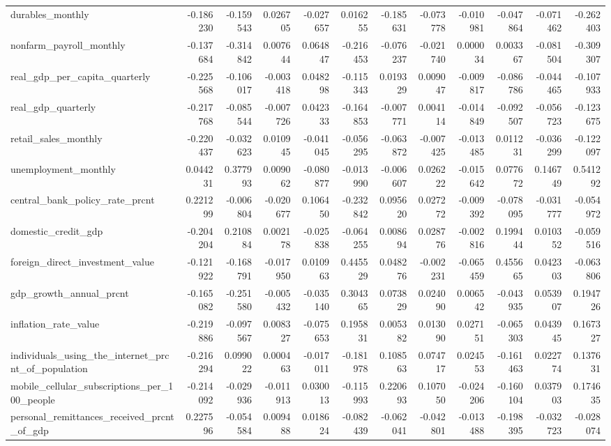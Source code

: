 \begin{tabular}{lrrrrrrrrrrr}
durables_monthly & -0.186230 & -0.159543 & 0.026705 & -0.027657 & 0.016255 & -0.185631 & -0.073778 & -0.010981 & -0.047864 & -0.071462 & -0.262403 \\
nonfarm_payroll_monthly & -0.137684 & -0.314842 & 0.007644 & 0.064847 & -0.216453 & -0.076237 & -0.021740 & 0.000034 & 0.003367 & -0.081504 & -0.309307 \\
real_gdp_per_capita_quarterly & -0.225568 & -0.106017 & -0.003418 & 0.048298 & -0.115343 & 0.019329 & 0.009047 & -0.009817 & -0.086786 & -0.044465 & -0.107933 \\
real_gdp_quarterly & -0.217768 & -0.085544 & -0.007726 & 0.042333 & -0.164853 & -0.007771 & 0.004114 & -0.014849 & -0.092507 & -0.056723 & -0.123675 \\
retail_sales_monthly & -0.220437 & -0.032623 & 0.010945 & -0.041045 & -0.056295 & -0.063872 & -0.007425 & -0.013485 & 0.011231 & -0.036299 & -0.122097 \\
unemployment_monthly & 0.044231 & 0.377993 & 0.009062 & -0.080877 & -0.013990 & -0.006607 & 0.026222 & -0.015642 & 0.077672 & 0.146749 & 0.541292 \\
central_bank_policy_rate_prcnt & 0.221299 & -0.006804 & -0.020677 & 0.106450 & -0.232842 & 0.095620 & 0.027272 & -0.009392 & -0.078095 & -0.031777 & -0.054972 \\
domestic_credit_gdp & -0.204204 & 0.210884 & 0.002178 & -0.025838 & -0.064255 & 0.008694 & 0.028776 & -0.002816 & 0.199444 & 0.010352 & -0.059516 \\
foreign_direct_investment_value & -0.121922 & -0.168791 & -0.017950 & 0.010963 & 0.445529 & 0.048276 & -0.002231 & -0.065459 & 0.455665 & 0.042303 & -0.063806 \\
gdp_growth_annual_prcnt & -0.165082 & -0.251580 & -0.005432 & -0.035140 & 0.304365 & 0.073829 & 0.024090 & 0.006542 & -0.043935 & 0.053907 & 0.194726 \\
inflation_rate_value & -0.219886 & -0.097567 & 0.008327 & -0.075653 & 0.195831 & 0.005382 & 0.013090 & 0.027151 & -0.065303 & 0.043945 & 0.167327 \\
individuals_using_the_internet_prcnt_of_population & -0.216294 & 0.099022 & 0.000463 & -0.017011 & -0.181978 & 0.108563 & 0.074717 & 0.024553 & -0.161463 & 0.022774 & 0.137631 \\
mobile_cellular_subscriptions_per_100_people & -0.214092 & -0.029936 & -0.011913 & 0.030013 & -0.115993 & 0.220693 & 0.107050 & -0.024206 & -0.160104 & 0.037903 & 0.174635 \\
personal_remittances_received_prcnt_of_gdp & 0.227596 & -0.054584 & 0.009488 & 0.018624 & -0.082439 & -0.062041 & -0.042801 & -0.013488 & -0.198395 & -0.032723 & -0.028074 \\

\end{tabular}
